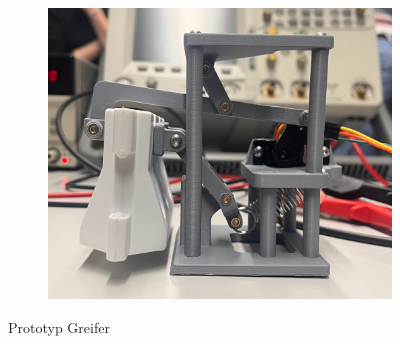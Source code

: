 \begin{figure}[H]
\begin{subfigure}{0.32\textwidth}
\includegraphics[width=0.95\linewidth]{assets/greifer-prototyp/Bild_greifer_2_anheben.jpeg} 
\end{subfigure}
\caption{Prototyp Greifer}
\label{fig:prototype-greifer}
\end{figure}